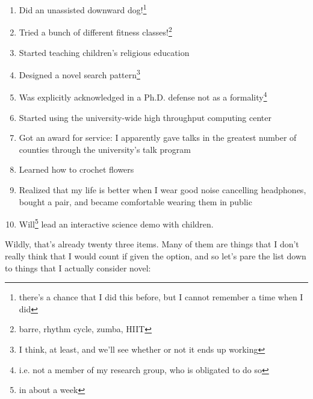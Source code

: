 \documentclass[12pt]{article}[titlepage]
\newcommand{\1}{\={a}}
\newcommand{\2}{\={e}}
\newcommand{\3}{\={\i}}
\newcommand{\4}{\=o}
\newcommand{\5}{\=u}
\newcommand{\6}{\={A}}
\renewcommand{\,}{\textsuperscript{,}}
\begin{document}
\begin{enumerate}
\item Did an unassisted downward dog!\footnote{there's a chance that I did this before, but I cannot remember a time when I did}  
\item Tried a bunch of different fitness classes!\footnote{barre, rhythm cycle, zumba, HIIT}  
\item Started teaching children's religious education  
\item Designed a novel search pattern\footnote{I think, at least, and we'll see whether or not it ends up working}  
\item Was explicitly acknowledged in a Ph.D. defense not as a formality\footnote{i.e. not a member of my research group, who is obligated to do so}  
\item Started using the university-wide high throughput computing center  
\item Got an award for service: I apparently gave talks in the greatest number of counties through the university's talk program  
\item Learned how to crochet flowers  
\item Realized that my life is better when I wear good noise cancelling headphones, bought a pair, and became comfortable wearing them in public  
\item Will\footnote{in about a week} lead an interactive science demo with children.  
\end{enumerate}

Wildly, that's already twenty three items.  
Many of them are things that I don't really think that I would count if given the option, and so let's pare the list down to things that I actually consider novel:
\end{document}
